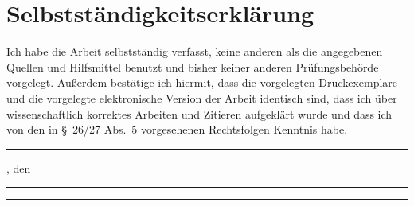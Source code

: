 \chapter*{Selbstständigkeitserklärung}\thispagestyle{empty}
Ich habe die Arbeit selbstständig verfasst, keine anderen als die angegebenen
Quellen und Hilfsmittel benutzt und bisher keiner anderen Prüfungsbehörde
vorgelegt. Außerdem bestätige ich hiermit, dass die vorgelegten Druckexemplare
und die vorgelegte elektronische Version der Arbeit identisch sind, dass ich
über wissenschaftlich korrektes Arbeiten und Zitieren aufgeklärt wurde und dass
ich von den in \S~26/27 Abs.~5 vorgesehenen Rechtsfolgen Kenntnis habe.

\vspace{2cm}
\noindent
\rule{4cm}{0.4pt}, den \rule{3cm}{0.4pt} \qquad \rule{6cm}{0.4pt}


